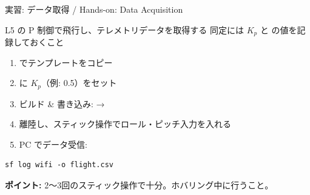 \documentclass[aspectratio=169, 14pt]{beamer}
\begin{document}
\begin{frame}[fragile]{実習: データ取得 / Hands-on: Data Acquisition}
  \begin{block}{L5 の P 制御で飛行し、テレメトリデータを取得する}
    {\footnotesize 同定には $K_p$ と  の値を記録しておくこと}
  \end{block}

  \vspace{0.5em}

  \begin{enumerate}
    \item {} でテンプレートをコピー
    \item {} に $K_p$（例: 0.5）をセット
    \item ビルド \& 書き込み:  → 
    \item 離陸し、スティック操作でロール・ピッチ入力を入れる
    \item PC でデータ受信:
  \end{enumerate}

  \begin{lstlisting}[style=sfcpp, title={ターミナル}]
sf log wifi -o flight.csv
  \end{lstlisting}

  \vspace{0.5em}

  {\small \textbf{ポイント:} 2〜3回のスティック操作で十分。ホバリング中に行うこと。}
\end{frame}
\end{document}
